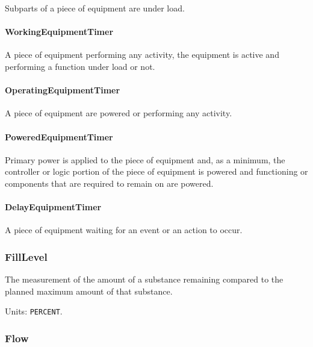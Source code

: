 Subparts of a piece of equipment are under load.


\paragraph{WorkingEquipmentTimer}\mbox{}
\label{sec:WorkingEquipmentTimer}


A piece of equipment performing any activity, the equipment is active and performing a function under load or not.


\paragraph{OperatingEquipmentTimer}\mbox{}
\label{sec:OperatingEquipmentTimer}


A piece of equipment are powered or performing any activity.


\paragraph{PoweredEquipmentTimer}\mbox{}
\label{sec:PoweredEquipmentTimer}


Primary  power is  applied  to the  piece  of  equipment and,  as  a minimum, the controller or logic portion of the piece of equipment is powered and functioning or components that are required to remain on are powered.


\paragraph{DelayEquipmentTimer}\mbox{}
\label{sec:DelayEquipmentTimer}


A piece of equipment waiting for an event or an action to occur.


\subsubsection{FillLevel}
\label{sec:FillLevel}



The measurement of the amount of a substance remaining compared to the planned maximum amount of that substance.


Units: \texttt{PERCENT}.

\subsubsection{Flow}
\label{sec:Flow}




